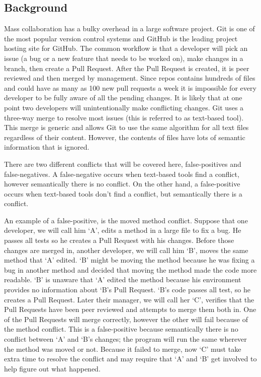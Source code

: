 \documentclass[10pt,draftclsnofoot,onecolumn]{IEEEtran}
\begin{document}
\subsection{Background}
Mass collaboration has a bulky overhead in a large software project. Git is one of the most popular version control systems and GitHub is the leading project hosting site for GitHub. The common workflow is that a developer will pick an issue (a bug or a new feature that needs to be worked on), make changes in a branch, then create a Pull Request. After the Pull Request is created, it is peer reviewed and then merged by management. Since repos contains hundreds of files and could have as many as 100 new pull requests a week it is impossible for every developer to be fully aware of all the pending changes. It is likely that at one point two developers will unintentionally make conflicting changes. Git uses a three-way merge to resolve most issues (this is referred to as text-based tool). This merge is generic and allows Git to use the same algorithm for all text files regardless of their content. However, the contents of files have lots of semantic information that is ignored.

There are two different conflicts that will be covered here, false-positives and false-negatives. A false-negative occurs when text-based tools find a conflict, however semantically there is no conflict. On the other hand, a false-positive occurs when text-based tools don’t find a conflict, but semantically there is a conflict.

An example of a false-positive, is the moved method conflict. Suppose that one developer, we will call him ‘A’, edits a method in a large file to fix a bug. He passes all tests so he creates a Pull Request with his changes. Before those changes are merged in, another developer, we will call him ‘B’, moves the same method that ‘A’ edited. ‘B’ might be moving the method because he was fixing a bug in another method and decided that moving the method made the code more readable. ‘B’ is unaware that ‘A’ edited the method because his environment provides no information about ‘B’s Pull Request. ‘B’s code passes all test, so he creates a Pull Request. Later their manager, we will call her ‘C’, verifies that the Pull Requests have been peer reviewed and attempts to merge them both in. One of the Pull Requests will merge correctly, however the other will fail because of the method conflict. This is a false-positive because semantically there is no conflict between ‘A’ and ‘B’s changes; the program will run the same wherever the method was moved or not. Because it failed to merge, now ‘C’ must take extra time to resolve the conflict and may require that ‘A’ and ‘B’ get involved to help figure out what happened.
\end{document}
